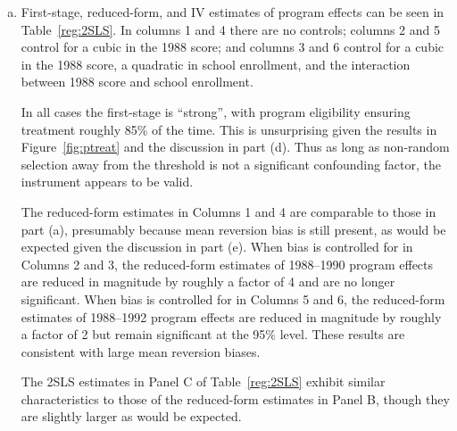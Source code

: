 \documentclass{article}
\begin{document}
\begin{enumerate}[(a)]
\begin{figure}[htb!]
\centering
{}
\caption{Gain Scores by 1988 Average Score Relative to the Regional Cutoff}
\label{fig:gain}
\end{figure}

The relationship between average 1988--1992 gain scores and and program eligibility can be seen in Figure~\ref{fig:gain}.  Gain scores in this case exhibit a discrete ``jump'' across the threshold, which suggests that the P-900 program {\em did} have a positive effect on student performance between 1988 and 1992. The delayed program effect may be a result of changes in the flow of program resources over time, or to other, unobserved factors.

\item First-stage, reduced-form, and IV estimates of program effects can be seen in Table~\ref{reg:2SLS}. In columns 1 and 4 there are no controls; columns 2 and 5 control for a cubic in the 1988 score; and columns 3 and 6 control for  a cubic in the 1988 score, a quadratic in school enrollment, and the interaction between 1988 score and school enrollment.

In all cases the first-stage is ``strong'', with program eligibility ensuring treatment roughly 85\% of the time. This is unsurprising given the results in Figure~\ref{fig:ptreat} and the discussion in part (d). Thus as long as non-random selection away from the threshold is not a significant confounding factor, the instrument appears to be valid.

The reduced-form estimates in Columns 1 and 4 are comparable to those in part (a), presumably because mean reversion bias is still present, as would be expected given the discussion in part (e). When bias is controlled for in Columns 2 and 3, the reduced-form estimates of 1988--1990 program effects are reduced in magnitude by roughly a factor of 4 and are no longer significant. When bias is controlled for in Columns 5 and 6, the reduced-form estimates of 1988--1992 program effects are reduced in magnitude by roughly a factor of 2 but remain significant at the 95\% level. These results are consistent with large mean reversion biases.

The 2SLS estimates in Panel C of Table~\ref{reg:2SLS} exhibit similar characteristics to those of the reduced-form estimates in Panel B, though they are slightly larger as would be expected.


\end{enumerate}
\end{document}

